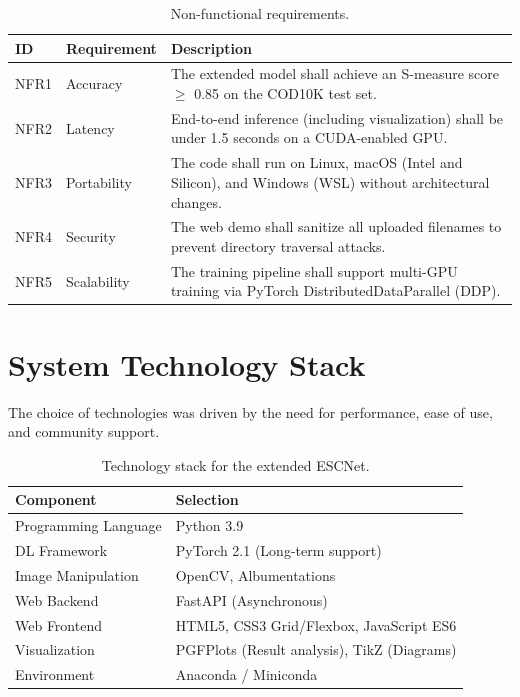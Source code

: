 \documentclass[12pt,a4paper]{report}
\begin{document}
\begin{table}[H]
\centering
\caption{Non-functional requirements.}
\label{tab:nfr}
\begin{tabular}{@{}lp{3cm}p{7.5cm}@{}}
\toprule
\textbf{ID} & \textbf{Requirement} & \textbf{Description} \\
\midrule
NFR1 & Accuracy        & The extended model shall achieve an S-measure score $\ge$ 0.85 on the COD10K test set. \\
NFR2 & Latency         & End-to-end inference (including visualization) shall be under 1.5 seconds on a CUDA-enabled GPU. \\
NFR3 & Portability     & The code shall run on Linux, macOS (Intel and Silicon), and Windows (WSL) without architectural changes. \\
NFR4 & Security        & The web demo shall sanitize all uploaded filenames to prevent directory traversal attacks. \\
NFR5 & Scalability     & The training pipeline shall support multi-GPU training via PyTorch DistributedDataParallel (DDP). \\
\bottomrule
\end{tabular}
\end{table}

\section{System Technology Stack}

The choice of technologies was driven by the need for performance, ease of use, and community support.

\begin{table}[H]
\centering
\caption{Technology stack for the extended ESCNet.}
\label{tab:stack}
\begin{tabular}{@{}ll@{}}
\toprule
\textbf{Component} & \textbf{Selection} \\
\midrule
Programming Language  & Python 3.9 \\
DL Framework          & PyTorch 2.1 (Long-term support) \\
Image Manipulation    & OpenCV, Albumentations \\
Web Backend           & FastAPI (Asynchronous) \\
Web Frontend          & HTML5, CSS3 Grid/Flexbox, JavaScript ES6 \\
Visualization         & PGFPlots (Result analysis), TikZ (Diagrams) \\
Environment           & Anaconda / Miniconda \\
\bottomrule
\end{tabular}
\end{table}
\end{document}
